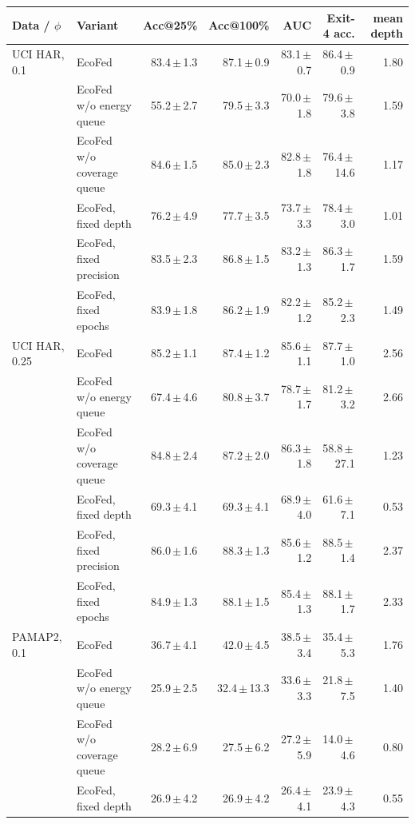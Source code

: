 \begin{tabular}{@{}llrrrrr@{}}
\toprule
Data / $\phi$ & Variant & Acc@25\% & Acc@100\% & AUC & Exit-4 acc. & mean depth\\
\midrule
UCI HAR, 0.1 & EcoFed & 83.4\,$\pm$\,1.3 & 87.1\,$\pm$\,0.9 & 83.1\,$\pm$\,0.7 & 86.4\,$\pm$\,0.9 & 1.80\\
 & EcoFed w/o energy queue & 55.2\,$\pm$\,2.7 & 79.5\,$\pm$\,3.3 & 70.0\,$\pm$\,1.8 & 79.6\,$\pm$\,3.8 & 1.59\\
 & EcoFed w/o coverage queue & 84.6\,$\pm$\,1.5 & 85.0\,$\pm$\,2.3 & 82.8\,$\pm$\,1.8 & 76.4\,$\pm$\,14.6 & 1.17\\
 & EcoFed, fixed depth & 76.2\,$\pm$\,4.9 & 77.7\,$\pm$\,3.5 & 73.7\,$\pm$\,3.3 & 78.4\,$\pm$\,3.0 & 1.01\\
 & EcoFed, fixed precision & 83.5\,$\pm$\,2.3 & 86.8\,$\pm$\,1.5 & 83.2\,$\pm$\,1.3 & 86.3\,$\pm$\,1.7 & 1.59\\
 & EcoFed, fixed epochs & 83.9\,$\pm$\,1.8 & 86.2\,$\pm$\,1.9 & 82.2\,$\pm$\,1.2 & 85.2\,$\pm$\,2.3 & 1.49\\
\midrule
UCI HAR, 0.25 & EcoFed & 85.2\,$\pm$\,1.1 & 87.4\,$\pm$\,1.2 & 85.6\,$\pm$\,1.1 & 87.7\,$\pm$\,1.0 & 2.56\\
 & EcoFed w/o energy queue & 67.4\,$\pm$\,4.6 & 80.8\,$\pm$\,3.7 & 78.7\,$\pm$\,1.7 & 81.2\,$\pm$\,3.2 & 2.66\\
 & EcoFed w/o coverage queue & 84.8\,$\pm$\,2.4 & 87.2\,$\pm$\,2.0 & 86.3\,$\pm$\,1.8 & 58.8\,$\pm$\,27.1 & 1.23\\
 & EcoFed, fixed depth & 69.3\,$\pm$\,4.1 & 69.3\,$\pm$\,4.1 & 68.9\,$\pm$\,4.0 & 61.6\,$\pm$\,7.1 & 0.53\\
 & EcoFed, fixed precision & 86.0\,$\pm$\,1.6 & 88.3\,$\pm$\,1.3 & 85.6\,$\pm$\,1.2 & 88.5\,$\pm$\,1.4 & 2.37\\
 & EcoFed, fixed epochs & 84.9\,$\pm$\,1.3 & 88.1\,$\pm$\,1.5 & 85.4\,$\pm$\,1.3 & 88.1\,$\pm$\,1.7 & 2.33\\
\midrule
PAMAP2, 0.1 & EcoFed & 36.7\,$\pm$\,4.1 & 42.0\,$\pm$\,4.5 & 38.5\,$\pm$\,3.4 & 35.4\,$\pm$\,5.3 & 1.76\\
 & EcoFed w/o energy queue & 25.9\,$\pm$\,2.5 & 32.4\,$\pm$\,13.3 & 33.6\,$\pm$\,3.3 & 21.8\,$\pm$\,7.5 & 1.40\\
 & EcoFed w/o coverage queue & 28.2\,$\pm$\,6.9 & 27.5\,$\pm$\,6.2 & 27.2\,$\pm$\,5.9 & 14.0\,$\pm$\,4.6 & 0.80\\
 & EcoFed, fixed depth & 26.9\,$\pm$\,4.2 & 26.9\,$\pm$\,4.2 & 26.4\,$\pm$\,4.1 & 23.9\,$\pm$\,4.3 & 0.55\\

\end{tabular}
